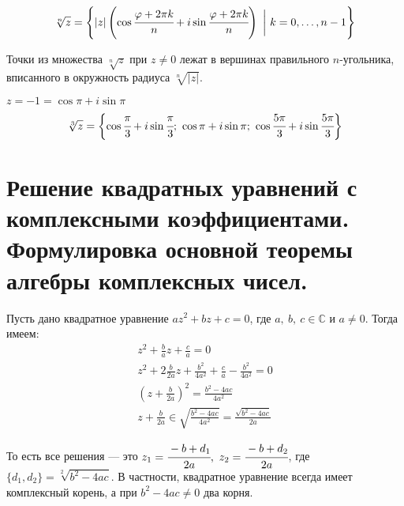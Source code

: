 \[ \sqrt[n]{z} = \Biggl\{|z|\left(\cos\cfrac{\varphi+2\pi k}{n}+i\sin\cfrac{\varphi+2\pi k }{n}\right)\ \biggl|\ k=0,\ldots,n-1\Biggr\}
\]

\begin{Comment}
Точки из множества $\sqrt[n]{z}$ при $z\neq 0$ лежат в вершинах правильного $n$-угольника, вписанного в окружность радиуса $\sqrt[n]{|z|}$. 
\end{Comment}

\begin{Examples} $z=-1=\cos\pi+i\sin\pi $
$$\sqrt[3]{z} = \biggl\{ \cos\cfrac\pi3+i\sin\cfrac\pi3;\ \cos\pi+i\sin\pi;\ \cos\cfrac{5\pi}{3}+i\sin\cfrac{5\pi}{3} \biggl\}
$$
\begin{center}
\end{center}

\end{Examples}

\section{Решение квадратных уравнений с комплексными коэффициентами. Формулировка основной теоремы алгебры комплексных чисел.}

Пусть дано квадратное уравнение $az^2+bz+c=0$, где $a,\ b,\ c\in\mathbb{C}$ и 	$ a \neq 0$. Тогда имеем:
\begin{gather*}
    z^2+\frac{b}{a}z+\frac{c}{a} = 0\\
    z^2+2\frac{b}{2a}z+\frac{b^2}{4a^2}+\frac{c}{a}-\frac{b^2}{4a^2} = 0\\
    \left(z+\frac{b}{2a}\right)^2=\frac{b^2-4ac}{4a^2}\\
    z+\frac{b}{2a} \in \sqrt{\frac{b^2-4ac}{4a^2}}=\frac{\sqrt{b^2-4ac}}{2a}
\end{gather*}

То есть все решения --- это $z_1 = \cfrac{-b+d_1}{2a},\ z_2 = \cfrac{-b+d_2}{2a}$, где $\{d_1,d_2\} = \sqrt[2]{b^2-4ac}$. В частности, квадратное уравнение всегда имеет комплексный корень, а при $b^2-4ac\neq0$ два корня.

